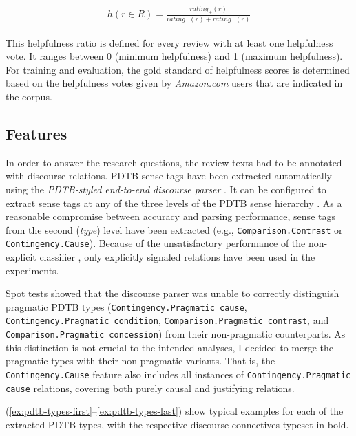 \documentclass[
    a4paper,%
    12pt,%
    oneside,%
    toc=bibliography,
    final,
]{scrartcl}
\begin{document}
\vspace{-2em}

\begin{align}
\label{helpfulness-fuction}
h(r \in R) = \frac{rating_+(r)}{rating_+(r) + rating_-(r)}
\end{align}

This helpfulness ratio is defined for every review with at least one helpfulness vote. It ranges between 0 (minimum helpfulness) and 1 (maximum helpfulness). For training and evaluation, the gold standard of helpfulness scores is determined based on the helpfulness votes given by \textit{Amazon.com} users that are indicated in the corpus.

\subsection{Features}

In order to answer the research questions, the review texts had to be annotated with discourse relations. PDTB sense tags have been extracted automatically using the \textit{PDTB-styled end-to-end discourse parser} \citep{Lin2014}. It can be configured to extract sense tags at any of the three levels of the PDTB sense hierarchy \citep[see][5]{Prasad2008}. As a reasonable compromise between accuracy and parsing performance, sense tags from the second (\textit{type}) level have been extracted (e.g., \lstinline|Comparison.Contrast| or \lstinline|Contingency.Cause|). Because of the unsatisfactory performance of the non-explicit classifier \citep[see][175]{Lin2014}, only explicitly signaled relations have been used in the experiments.


\begin{sloppypar}
Spot tests showed that the discourse parser was unable to correctly distinguish pragmatic PDTB types (\lstinline|Contingency.Pragmatic cause|, \lstinline|Contingency.Pragmatic condition|, \lstinline|Comparison.Pragmatic contrast|, and \lstinline|Comparison.Pragmatic concession|) from their non-pragmatic counterparts. As this distinction is not crucial to the intended analyses, I decided to merge the pragmatic types with their non-pragmatic variants. That is, the \lstinline|Contingency.Cause| feature also includes all instances of \lstinline|Contingency.Pragmatic cause| relations, covering both purely causal and justifying relations.
\end{sloppypar}

(\ref{ex:pdtb-types-first}–\ref{ex:pdtb-types-last}) show typical examples for each of the extracted PDTB types, with the respective discourse connectives typeset in bold.
\end{document}
